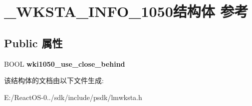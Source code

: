 \hypertarget{struct___w_k_s_t_a___i_n_f_o__1050}{}\section{\+\_\+\+W\+K\+S\+T\+A\+\_\+\+I\+N\+F\+O\+\_\+1050结构体 参考}
\label{struct___w_k_s_t_a___i_n_f_o__1050}
\subsection*{Public 属性}
\begin{DoxyCompactItemize}
\item 
\mbox{\label{struct___w_k_s_t_a___i_n_f_o__1050_a436d39149df7eeaff7288019c6c65e9c}} 
B\+O\+OL {\bfseries wki1050\+\_\+use\+\_\+close\+\_\+behind}
\end{DoxyCompactItemize}


该结构体的文档由以下文件生成\+:\begin{DoxyCompactItemize}
\item 
E\+:/\+React\+O\+S-\/0../sdk/include/psdk/lmwksta.\+h\end{DoxyCompactItemize}
